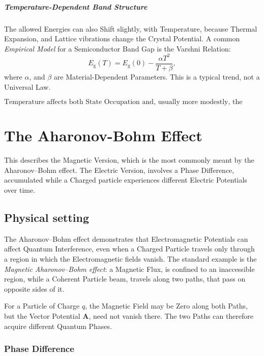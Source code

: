 \documentclass[a4paper, 10pt, onepage]{elegantbook}
\begin{document}
{\paragraph{Temperature-Dependent Band Structure}

The allowed Energies can also Shift slightly, with Temperature, because Thermal Expansion, and Lattice vibrations 
change the Crystal Potential.
A common \emph{Empirical Model} for a Semiconductor Band Gap is the Varshni Relation:
\[
E_{\mathrm g}(T)
=
E_{\mathrm g}(0)
-
\frac{\alpha T^2}{T+\beta},
\]
where \(\alpha\), and \(\beta\) are Material-Dependent Parameters. This is a typical trend, not a Universal Law.

\[
\boxed{
\text{Temperature affects both State Occupation and, usually more modestly,
the Energies and widths of the allowed Bands.}
}
\]











\chapter{The Aharonov-Bohm Effect}

This describes the Magnetic Version, which is the most commonly meant by the Aharonov–Bohm effect. The Electric 
Version, involves a Phase Difference, accumulated while a Charged particle experiences different Electric Potentials 
over time.  

\section{Physical setting}

The Aharonov--Bohm effect demonstrates that Electromagnetic Potentials can affect Quantum Interference, even when a 
Charged Particle travels only through a region in which the Electromagnetic fields vanish. The standard example is the 
\emph{Magnetic Aharonov--Bohm effect}: a Magnetic Flux, is confined to an inaccessible region, while a Coherent 
Particle beam, travels along two paths, that pass on opposite sides of it.

For a Particle of Charge \(q\), the Magnetic Field may be Zero along both Paths, but the Vector Potential 
\(\mathbf{A}\), need not vanish
there. The two Paths can therefore acquire different Quantum Phases.

\subsection{Phase Difference}

}
\end{document}

